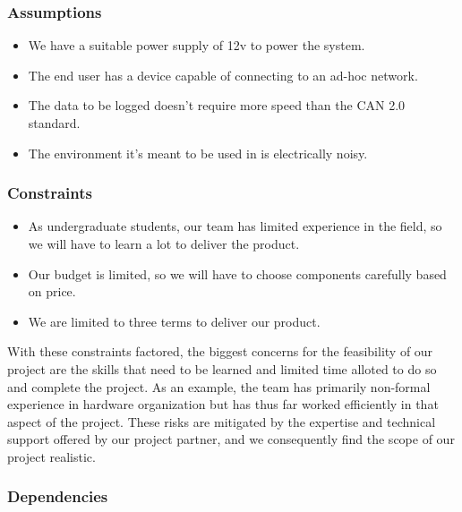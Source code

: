 \hypertarget{assumptions}{%
\subsubsection{Assumptions}\label{assumptions}}

\begin{itemize}
\tightlist
\item
  We have a suitable power supply of 12v to power the system.
\item
  The end user has a device capable of connecting to an ad-hoc network.
\item
  The data to be logged doesn't require more speed than the CAN 2.0
  standard.
\item
  The environment it's meant to be used in is electrically noisy.
\end{itemize}

\hypertarget{constraints}{%
\subsubsection{Constraints}\label{constraints}}

\begin{itemize}
\tightlist
\item
  As undergraduate students, our team has limited experience in the
  field, so we will have to learn a lot to deliver the product.
\item
  Our budget is limited, so we will have to choose components carefully
  based on price.
\item
  We are limited to three terms to deliver our product.
\end{itemize}

With these constraints factored, the biggest concerns for the
feasibility of our project are the skills that need to be learned and
limited time alloted to do so and complete the project. As an example,
the team has primarily non-formal experience in hardware organization
but has thus far worked efficiently in that aspect of the project. These
risks are mitigated by the expertise and technical support offered by
our project partner, and we consequently find the scope of our project
realistic.

\hypertarget{dependencies}{%
\subsubsection{Dependencies}\label{dependencies}}

